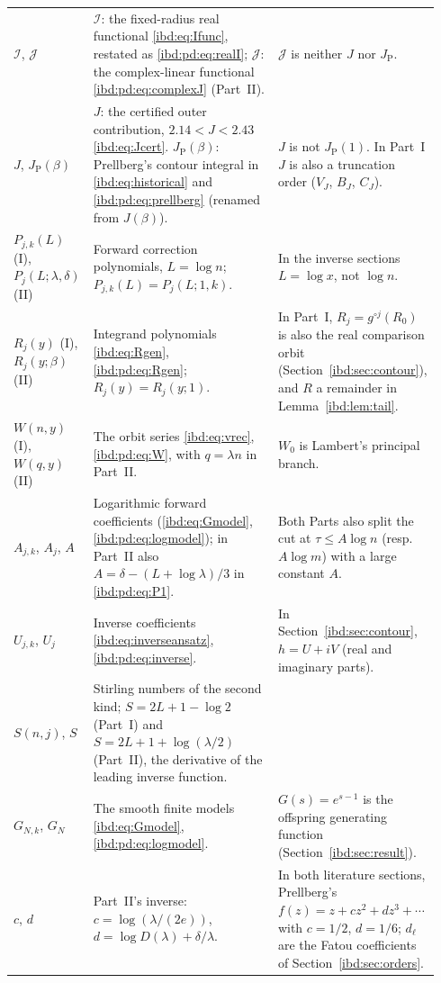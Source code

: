\documentclass[11pt,letterpaper]{article}
\theoremstyle{remark}\newtheorem{remark}[theorem]{Remark}
\newcommand{\I}{\mathcal I}
\newcommand{\J}{\mathcal J}
\newcommand{\JP}{J_{\mathrm P}}
\begin{document}
{\begin{longtable}{@{}>{\raggedright\arraybackslash}p{0.15\linewidth}>{\raggedright\arraybackslash}p{0.47\linewidth}>{\raggedright\arraybackslash}p{0.32\linewidth}@{}}
$\I$, $\J$ & $\I$: the fixed-radius real functional \eqref{ibd:eq:Ifunc}, restated as \eqref{ibd:pd:eq:realI}; $\J$: the complex-linear functional \eqref{ibd:pd:eq:complexJ} (Part~II). & $\J$ is neither $J$ nor $\JP$.\\
$J$, $\JP(\beta)$ & $J$: the certified outer contribution, $2.14<J<2.43$ \eqref{ibd:eq:Jcert}. $\JP(\beta)$: Prellberg's contour integral in \eqref{ibd:eq:historical} and \eqref{ibd:pd:eq:prellberg} (renamed from $J(\beta)$). & $J$ is not $\JP(1)$. In Part~I $J$ is also a truncation order ($V_J$, $B_J$, $C_J$).\\
$P_{j,k}(L)$ (I), $P_j(L;\lambda,\delta)$ (II) & Forward correction polynomials, $L=\log n$; $P_{j,k}(L)=P_j(L;1,k)$. & In the inverse sections $L=\log x$, not $\log n$.\\
$R_j(y)$ (I), $R_j(y;\beta)$ (II) & Integrand polynomials \eqref{ibd:eq:Rgen}, \eqref{ibd:pd:eq:Rgen}; $R_j(y)=R_j(y;1)$. & In Part~I, $R_j=g^{\circ j}(R_0)$ is also the real comparison orbit (Section~\ref{ibd:sec:contour}), and $R$ a remainder in Lemma~\ref{ibd:lem:tail}.\\
$W(n,y)$ (I), $W(q,y)$ (II) & The orbit series \eqref{ibd:eq:vrec}, \eqref{ibd:pd:eq:W}, with $q=\lambda n$ in Part~II. & $W_0$ is Lambert's principal branch.\\
$A_{j,k}$, $A_j$, $A$ & Logarithmic forward coefficients (\eqref{ibd:eq:Gmodel}, \eqref{ibd:pd:eq:logmodel}); in Part~II also $A=\delta-(L+\log\lambda)/3$ in \eqref{ibd:pd:eq:P1}. & Both Parts also split the cut at $\tau\le A\log n$ (resp.\ $A\log m$) with a large constant $A$.\\
$U_{j,k}$, $U_j$ & Inverse coefficients \eqref{ibd:eq:inverseansatz}, \eqref{ibd:pd:eq:inverse}. & In Section~\ref{ibd:sec:contour}, $h=U+iV$ (real and imaginary parts).\\
$S(n,j)$, $S$ & Stirling numbers of the second kind; $S=2L+1-\log2$ (Part~I) and $S=2L+1+\log(\lambda/2)$ (Part~II), the derivative of the leading inverse function. & \\
$G_{N,k}$, $G_N$ & The smooth finite models \eqref{ibd:eq:Gmodel}, \eqref{ibd:pd:eq:logmodel}. & $G(s)=e^{s-1}$ is the offspring generating function (Section~\ref{ibd:sec:result}).\\
$c$, $d$ & Part~II's inverse: $c=\log(\lambda/(2e))$, $d=\log D(\lambda)+\delta/\lambda$. & In both literature sections, Prellberg's $f(z)=z+cz^2+dz^3+\cdots$ with $c=1/2$, $d=1/6$; $d_\ell$ are the Fatou coefficients of Section~\ref{ibd:sec:orders}.\\

\end{longtable}}
\end{document}
